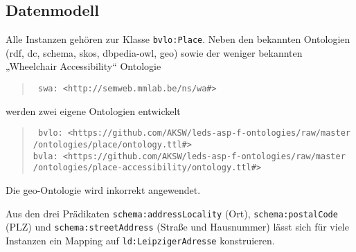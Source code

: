 \documentclass[a4paper,11pt]{article}
\begin{document}
\subsection{Datenmodell}

Alle Instanzen gehören zur Klasse \texttt{bvlo:Place}.  Neben den bekannten
Ontologien (rdf, dc, schema, skos, dbpedia-owl, geo) sowie der weniger bekannten
„Wheelchair Accessibility“ Ontologie 
\begin{quote}\tt
  swa: <http://semweb.mmlab.be/ns/wa\#>
\end{quote}
werden zwei eigene Ontologien entwickelt
\begin{quote}\tt 
  bvlo: <https://github.com/AKSW/leds-asp-f-ontologies/raw/master\\/ontologies/place/ontology.ttl\#>\\
  bvla: <https://github.com/AKSW/leds-asp-f-ontologies/raw/master\\/ontologies/place-accessibility/ontology.ttl\#>
\end{quote}
Die geo-Ontologie wird inkorrekt angewendet.

Aus den drei Prädikaten \texttt{schema:addressLocality} (Ort),
\texttt{schema:postalCode} (PLZ) und \texttt{schema:streetAddress} (Straße und
Hausnummer) lässt sich für viele Instanzen ein Mapping auf
\texttt{ld:LeipzigerAdresse} konstruieren.
\end{document}
